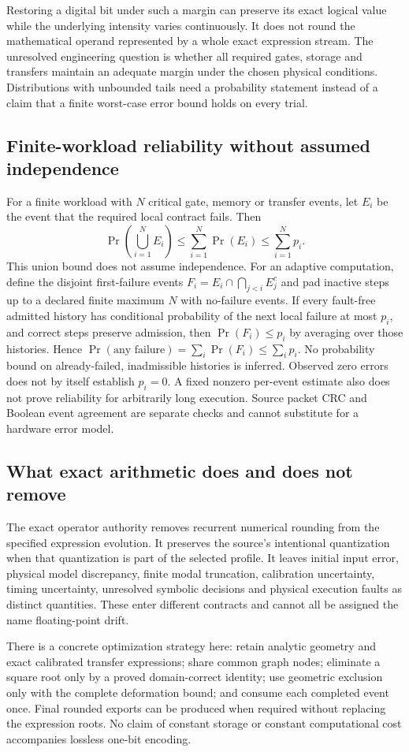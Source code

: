 Restoring a digital bit under such a margin can preserve its exact logical
value while the underlying intensity varies continuously. It does not round
the mathematical operand represented by a whole exact expression stream.
The unresolved engineering question is whether all required gates, storage
and transfers maintain an adequate margin under the chosen physical conditions.
Distributions with unbounded tails need a probability statement instead of
a claim that a finite worst-case error bound holds on every trial.

\subsection{Finite-workload reliability without assumed independence}
For a finite workload with $N$ critical gate, memory or transfer events, let
$E_i$ be the event that the required local contract fails. Then
\begin{equation}
 \Pr\!\left(\bigcup_{i=1}^N E_i\right)
       \le\sum_{i=1}^N\Pr(E_i)\le\sum_{i=1}^N p_i.
\end{equation}
This union bound does not assume independence. For an adaptive computation,
define the disjoint first-failure events
$F_i=E_i\cap\bigcap_{j<i}E_j^c$ and pad inactive steps up to a declared finite
maximum $N$ with no-failure events. If every fault-free admitted history has
conditional probability of the next local failure at most $p_i$, and correct
steps preserve admission, then $\Pr(F_i)\le p_i$ by averaging over those
histories. Hence $\Pr(\text{any failure})=\sum_i\Pr(F_i)\le\sum_i p_i$.
No probability bound on already-failed, inadmissible histories is inferred.
Observed zero errors does not by itself establish $p_i=0$. A fixed nonzero
per-event estimate also does not prove reliability for arbitrarily long
execution. Source packet CRC and Boolean event agreement are separate checks
and cannot substitute for a hardware error model.

\subsection{What exact arithmetic does and does not remove}
The exact operator authority removes recurrent numerical rounding from the
specified expression evolution. It preserves the source's intentional
quantization when that quantization is part of the selected profile. It leaves
initial input error, physical model discrepancy, finite modal truncation,
calibration uncertainty, timing uncertainty, unresolved symbolic decisions and
physical execution faults as distinct quantities. These enter different
contracts and cannot all be assigned the name floating-point drift.

There is a concrete optimization strategy here: retain analytic geometry and
exact calibrated transfer expressions; share common graph nodes; eliminate a
square root only by a proved domain-correct identity; use geometric exclusion
only with the complete deformation bound; and consume each completed event
once. Final rounded exports can be produced when required without replacing
the expression roots. No claim of constant storage or constant computational
cost accompanies lossless one-bit encoding.

